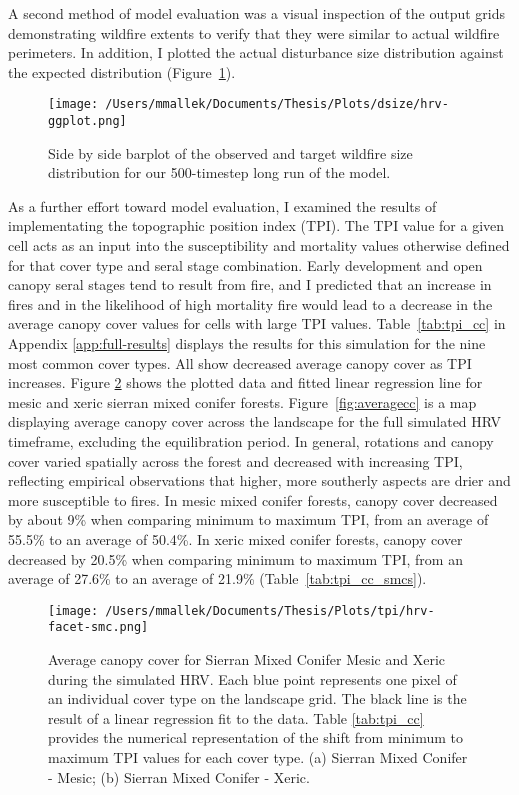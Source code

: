 A second method of model evaluation was a visual inspection of the output grids demonstrating wildfire extents to verify that they were similar to actual wildfire perimeters. In addition, I plotted the actual disturbance size distribution against the expected distribution (Figure~\ref{fig:dsize}). 


\begin{figure}[!htbp]
  \centering
    \centering
    \texttt{[image: /Users/mmallek/Documents/Thesis/Plots/dsize/hrv-ggplot.png]}
  \caption{Side by side barplot of the observed and target wildfire size distribution for our 500-timestep long run of the model.}
  \label{fig:dsize}
\end{figure}

As a further effort toward model evaluation, I examined the results of implementating the topographic position index (TPI). The TPI value for a given cell acts as an input into the susceptibility and mortality values otherwise defined for that cover type and seral stage combination. Early development and open canopy seral stages tend to result from fire, and I predicted that an increase in fires and in the likelihood of high mortality fire would lead to a decrease in the average canopy cover values for cells with large TPI values. Table~\ref{tab:tpi_cc} in Appendix \ref{app:full-results} displays the results for this simulation for the nine most common cover types. All show decreased average canopy cover as TPI increases. Figure \ref{fig:tpi_cc_smc} shows the plotted data and fitted linear regression line for mesic and xeric sierran mixed conifer forests. Figure~\ref{fig:averagecc} is a map displaying average canopy cover across the landscape for the full simulated HRV timeframe, excluding the equilibration period. In general, rotations and canopy cover varied spatially across the forest and decreased with increasing TPI, reflecting empirical observations that higher, more southerly aspects are drier and more susceptible to fires. In mesic mixed conifer forests, canopy cover decreased by about 9\% when comparing minimum to maximum TPI, from an average of 55.5\% to an average of 50.4\%. In xeric mixed conifer forests, canopy cover decreased by 20.5\% when comparing minimum to maximum TPI, from an average of 27.6\% to an average of 21.9\% (Table~\ref{tab:tpi_cc_smcs}).


\begin{figure}[!htbp]
\centering
\texttt{[image: /Users/mmallek/Documents/Thesis/Plots/tpi/hrv-facet-smc.png]}
\caption{Average canopy cover for Sierran Mixed Conifer Mesic and Xeric during the simulated HRV. Each blue point represents one pixel of an individual cover type on the landscape grid. The black line is the result of a linear regression fit to the data. Table \ref{tab:tpi_cc} provides the numerical representation of the shift from minimum to maximum TPI values for each cover type. (a) Sierran Mixed Conifer - Mesic; (b) Sierran Mixed Conifer - Xeric.}
\label{fig:tpi_cc_smc}
\end{figure}

